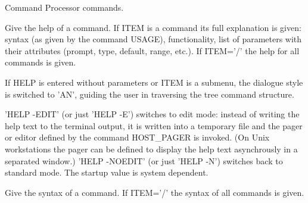 \ifMENUtext
   \par
Command Processor commands.  


\fi


\BEGARG
{}
\ENDARG
{}
\ENDOPT

   \par
Give the help of a command.  If ITEM is a command its full explanation is 
   given:  syntax (as given by the command USAGE), functionality, list of 
   parameters with their attributes (prompt, type, default, range, etc.).  If 
   ITEM='/' the help for all commands is given.  

   \par
If HELP is entered without parameters or ITEM is a submenu, the dialogue 
   style is switched to 'AN', guiding the user in traversing the tree command 
   structure.  

   \par
'HELP -EDIT' (or just 'HELP -E') switches to edit mode:  instead of writing 
   the help text to the terminal output, it is written into a temporary file 
   and the pager or editor defined by the command HOST_PAGER is invoked.  (On 
   Unix workstations the pager can be defined to display the help text 
   asynchrously in a separated window.) 'HELP -NOEDIT' (or just 'HELP -N') 
   switches back to standard mode.  The startup value is system dependent.  

\ENDCMD


\BEGARG
{}
\ENDARG

   \par
Give the syntax of a command.  If ITEM='/' the syntax of all commands is 
   given.  

\ENDCMD


\BEGARG
{}
\ENDARG
{}
\ENDOPT


